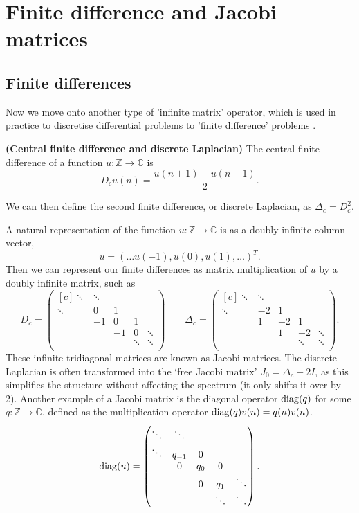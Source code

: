 \documentclass[../main.tex]{subfiles}
\begin{document}
\section{Finite difference and Jacobi matrices}

\subsection{Finite differences}
Now we move onto another type of 'infinite matrix' operator, which is used in
practice to discretise differential problems to 'finite difference' problems 
\cite{suli2003introduction}.

\begin{definition}{\textbf{(Central finite difference and discrete Laplacian)}}
  The central finite difference of a function $u: \mathbb{Z} \rightarrow
  \mathbb{C}$ is $$D_c u (n) = \frac{u(n+1) - u(n-1)}{2}.$$

  We can then define the second finite difference, or discrete Laplacian, as
  $\Delta_c = D_c^2$.
\end{definition}

A natural representation of the function $u: \mathbb{Z} \rightarrow \mathbb{C}$
is as a doubly infinite column vector, $$u = (\hdots u(-1), u(0), u(1),\hdots)^T.$$
Then we can represent our finite differences as matrix multiplication of $u$
by a doubly infinite matrix, such as
  $$ 
  D_c = 
  \begin{pmatrix*}[c]
    \ddots & \ddots & & & \\
    \ddots & 0 & 1 & & \\
    & -1 & 0 & 1 & \\
    & & -1 & 0 & \ddots \\
    & & & \ddots & \ddots \\
  \end{pmatrix*}
  \quad\quad
  \Delta_c = 
  \begin{pmatrix*}[c] 
    \ddots & \ddots & & & \\
    \ddots & -2 & 1 & & \\
    & 1 & -2 & 1 & \\
    & & 1 & -2 & \ddots \\
    & & & \ddots & \ddots \\
  \end{pmatrix*}. 
  $$
These infinite tridiagonal matrices are known as Jacobi matrices. The discrete
Laplacian is often transformed into the `free Jacobi matrix' $J_0 = \Delta_c +
2I$, as this simplifies the structure without affecting the spectrum (it only
shifts it over by 2). Another example of a Jacobi matrix is the diagonal
operator $\mathrm{diag}(q)$ for some $q: \mathbb{Z} \rightarrow \mathbb{C}$, defined as
the multiplication operator $\mathrm{diag}(q)v(n) = q(n)v(n)$.
  $$ 
  \diag(u) = 
  \begin{pmatrix*}[c]
    \ddots & \ddots & & & \\
    \ddots & q_{-1} & 0 & & \\
    & 0 & q_0 & 0 & \\
    & & 0 & q_1 & \ddots \\
    & & & \ddots & \ddots \\
  \end{pmatrix*}.
  $$
\end{document}
